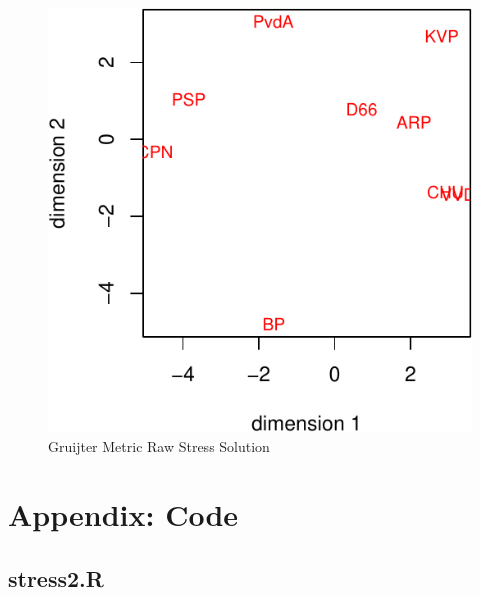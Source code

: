\documentclass[
  12pt,
]{article}
\theoremstyle{definition}
\theoremstyle{definition}
\theoremstyle{definition}
\theoremstyle{definition}
\theoremstyle{remark}
\begin{document}
\begin{figure}

{\centering \includegraphics{stress2_files/figure-latex/grfig2-1} 

}

\caption{Gruijter Metric Raw Stress Solution}\label{fig:grfig2}
\end{figure}

\section{Appendix: Code}\label{appendix-code}

\subsection{stress2.R}\label{stress2.r}
\end{document}
